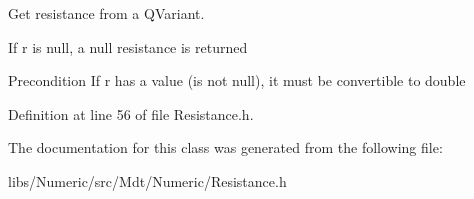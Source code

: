 Get resistance from a Q\+Variant. 

If r is null, a null resistance is returned

\begin{DoxyPrecond}{Precondition}
If r has a value (is not null), it must be convertible to double 
\end{DoxyPrecond}


Definition at line 56 of file Resistance.\+h.



The documentation for this class was generated from the following file\+:\begin{DoxyCompactItemize}
\item 
libs/\+Numeric/src/\+Mdt/\+Numeric/Resistance.\+h\end{DoxyCompactItemize}
